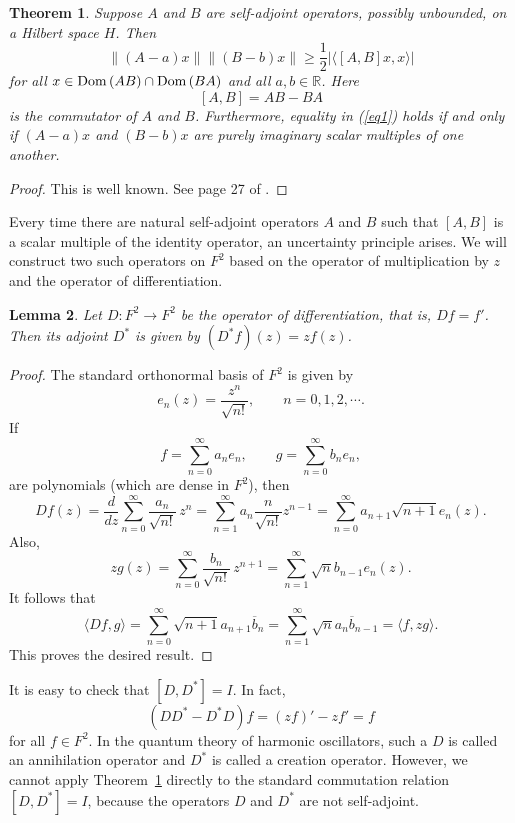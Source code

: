 \documentclass[12pt,reqno]{amsart}
\newtheorem{thm}{Theorem}
\newtheorem{lemma}[thm]{Lemma}
\begin{document}
\begin{thm}
Suppose $A$ and $B$ are self-adjoint operators, possibly unbounded, on a Hilbert space $H$. Then
\begin{equation}
\|(A-a)x\|\|(B-b)x\|\ge\frac12|\langle[A,B]x,x\rangle|
\label{eq1}
\end{equation}
for all $x\in{{\rm Dom}\,}(AB)\cap{{\rm Dom}\,}(BA)$ and all $a,b\in{{\mathbb R}}$. Here 
$$[A,B]=AB-BA$$
is the commutator of $A$ and $B$. Furthermore, equality in (\ref{eq1}) holds if and only if $(A-a)x$
and $(B-b)x$ are purely imaginary scalar multiples of one another.
\label{1}
\end{thm}

\begin{proof}
This is well known. See page 27 of \cite{F, G}.
\end{proof}

Every time there are natural self-adjoint operators $A$ and $B$ such that $[A,B]$ is a scalar multiple of
the identity operator, an uncertainty principle arises. We will construct two such operators on $F^2$
based on the operator of multiplication by $z$ and the operator of differentiation.

\begin{lemma}
Let $D:F^2\to F^2$ be the operator of differentiation, that is, $Df=f'$. Then its adjoint $D^*$ is given
by $(D^*f)(z)=zf(z)$.
\label{2}
\end{lemma}

\begin{proof}
The standard orthonormal basis of $F^2$ is given by
$$e_n(z)=\frac{z^n}{\sqrt{n!}},\qquad n=0,1,2,\cdots.$$
If
$$f=\sum_{n=0}^\infty a_ne_n,\qquad g=\sum_{n=0}^\infty b_ne_n,$$
are polynomials (which are dense in $F^2$), then
$$Df(z)=\frac d{dz}\sum_{n=0}^\infty\frac{a_n}{\sqrt{n!}}\,z^n=\sum_{n=1}^\infty a_n\frac n{\sqrt{n!}} z^{n-1}
=\sum_{n=0}^\infty a_{n+1}\sqrt{n+1}e_n(z).$$
Also,
$$zg(z)=\sum_{n=0}^\infty\frac{b_n}{\sqrt{n!}}\,z^{n+1}=\sum_{n=1}^\infty\sqrt nb_{n-1}e_n(z).$$
It follows that
$$\langle Df,g\rangle=\sum_{n=0}^\infty\sqrt{n+1}a_{n+1}\overline b_n
=\sum_{n=1}^\infty\sqrt na_n\overline b_{n-1}=\langle f,zg\rangle.$$
This proves the desired result.
\end{proof}

It is easy to check that $[D,D^*]=I$. In fact,
\begin{equation}
(DD^*-D^*D)f=(zf)'-zf'=f
\label{eq2}
\end{equation}
for all $f\in F^2$. In the quantum theory of harmonic oscillators, such a $D$ is called an annihilation operator
and $D^*$ is called a creation operator. However, we cannot apply Theorem~\ref{1} directly to the standard 
commutation relation $[D,D^*]=I$, because the operators $D$ and $D^*$ are not self-adjoint.
 
\end{document}
